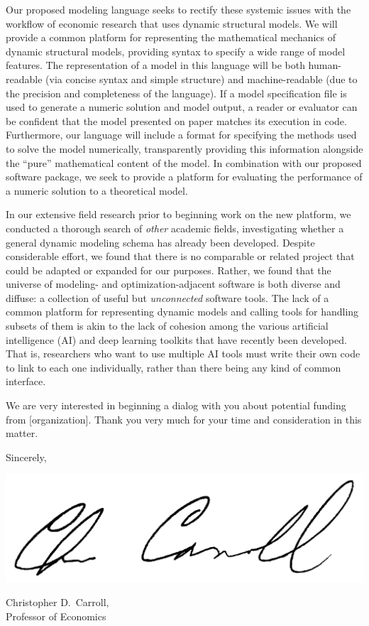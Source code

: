 \documentclass[11pt,pdftex,letterpaper]{article}
\begin{document}
Our proposed modeling language seeks to rectify these systemic issues with the workflow of economic research that uses dynamic structural models. We will provide a common platform for representing the mathematical mechanics of dynamic structural models, providing syntax to specify a wide range of model features. The representation of a model in this language will be both human-readable (via concise syntax and simple structure) and machine-readable (due to the precision and completeness of the language). If a model specification file is used to generate a numeric solution and model output, a reader or evaluator can be confident that the model presented on paper matches its execution in code. Furthermore, our language will include a format for specifying the methods used to solve the model numerically, transparently providing this information alongside the ``pure'' mathematical content of the model. In combination with our proposed software package, we seek to provide a platform for evaluating the performance of a numeric solution to a theoretical model.

In our extensive field research prior to beginning work on the new platform, we conducted a thorough search of \textit{other} academic fields, investigating whether a general dynamic modeling schema has already been developed. Despite considerable effort, we found that there is no comparable or related project that could be adapted or expanded for our purposes. Rather, we found that the universe of modeling- and optimization-adjacent software is both diverse and diffuse: a collection of useful but \textit{unconnected} software tools. The lack of a common platform for representing dynamic models and calling tools for handling subsets of them is akin to the lack of cohesion among the various artificial intelligence (AI) and deep learning toolkits that have recently been developed. That is, researchers who want to use multiple AI tools must write their own code to link to each one individually, rather than there being any kind of common interface.

We are very interested in beginning a dialog with you about potential funding from [organization]. Thank you very much for your time and consideration in this matter.

\vspace{0.5cm}

{\parskip=2pt Sincerely,

\includegraphics[scale=0.7]{CDCsignature.jpg}

Christopher D.\ Carroll,\\ Professor of Economics}
\end{document}
